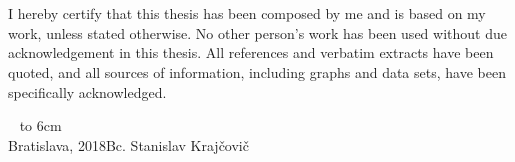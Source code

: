 \documentclass[12pt, a4paper, oneside]{book}
\newcommand{\mfauthor}{Bc. Stanislav Krajčovič}
\newcommand{\mfplacedate}{Bratislava, 2018}
\begin{document}
\thispagestyle{empty}

\begin{figure}[H]
\begin{center}
\label{img:zadanie}
\end{center}
\end{figure}

{~}\vspace{12cm}

\noindent
\begin{minipage}{0.25\textwidth}~\end{minipage}
\begin{minipage}{0.75\textwidth}
I hereby certify that this thesis has been composed by me and is based on my work, unless stated otherwise. No other person's work has been used without due acknowledgement in this thesis. All references and verbatim extracts have been quoted, and all sources of information, including graphs and data sets, have been specifically acknowledged.
\newline \newline
\end{minipage}
\vfill
~ \hfill {\hbox to 6cm{\dotfill}} \\
\mfplacedate \hfill \mfauthor
\vfill\eject 
\end{document}
